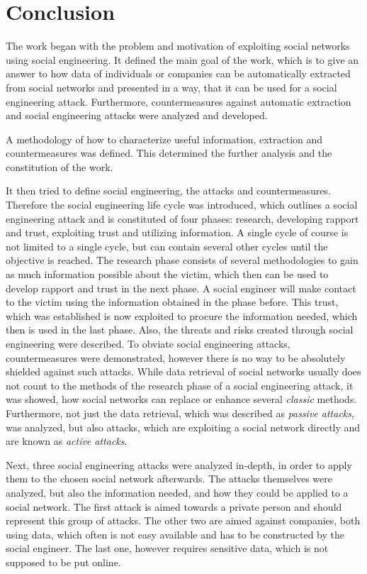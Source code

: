 \chapter{Conclusion}
\label{chap:conclusion}

The work began with the problem and motivation of exploiting social networks
using social engineering. It defined the main goal of the work, which is to
give an answer to how data of individuals or companies can be automatically
extracted from social networks and presented in a way, that it can be used for
a social engineering attack. Furthermore, countermeasures against automatic
extraction and social engineering attacks were analyzed and developed.

A methodology of how to characterize useful information, extraction and
countermeasures was defined. This determined the further analysis and the
constitution of the work.

It then tried to define social engineering, the attacks and countermeasures.
Therefore the social engineering life cycle was introduced, which outlines a
social engineering attack and is constituted of four phases: research, developing
rapport and trust, exploiting trust and utilizing information. A single cycle
of course is not limited to a single cycle, but can contain several other
cycles until the objective is reached. The research phase consists of several
methodologies to gain as much information possible about the victim, which then
can be used to develop rapport and trust in the next phase. A social engineer
will make contact to the victim using the information obtained in the phase
before. This trust, which was established is now exploited to procure the
information needed, which then is used in the last phase. Also, the threats
and risks created through social engineering were described. To obviate social
engineering attacks, countermeasures were demonstrated, however there is no way
to be absolutely shielded against such attacks. While data retrieval of social
networks usually does not count to the methods of the research phase of a
social engineering attack, it was showed, how social networks can replace or
enhance several \textit{classic} methods. Furthermore, not just the data
retrieval, which was described as \textit{passive attacks}, was analyzed, but
also attacks, which are exploiting a social network directly and are known as
\textit{active attacks}.

Next, three social engineering attacks were analyzed in-depth, in
order to apply them to the chosen social network afterwards. The attacks
themselves were analyzed, but also the information needed, and how they could
be applied to a social network. The first attack is aimed towards a private
person and should represent this group of attacks. The other two are aimed
against companies, both using data, which often is not easy available and has
to be constructed by the social engineer. The last one, however requires
sensitive data, which is not supposed to be put online.

